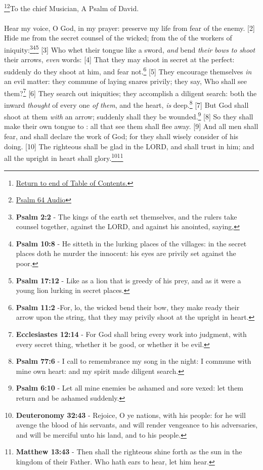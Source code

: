\footnote{\textcolor[rgb]{0.00,0.25,0.00}{\hyperlink{TOC}{Return to end of Table of Contents.}}}\footnote{\href{https://audiobible.com/bible/psalms_64.html}{\textcolor[cmyk]{0.99998,1,0,0}{Psalm 64 Audio}}}\textcolor[cmyk]{0.99998,1,0,0}{To the chief Musician, A Psalm of David.}\\
\\
\textcolor[cmyk]{0.99998,1,0,0}{Hear my voice, O God, in my prayer: preserve my life from fear of the enemy.}
[2] \textcolor[cmyk]{0.99998,1,0,0}{Hide me from the secret counsel of the wicked; from the  of the workers of iniquity:}\footnote{\textbf{Psalm 2:2} - The
kings of the earth set themselves, and the rulers take counsel together, against the LORD, and against his anointed, saying,}\footnote{\textbf{Psalm 10:8} - He sitteth in the lurking places of the villages: in the secret places doth he murder the innocent: his eyes are privily set against the poor.}\footnote{\textbf{Psalm 17:12} - Like as a lion that is greedy of his prey, and as it were a young lion lurking in secret places.}
[3] \textcolor[cmyk]{0.99998,1,0,0}{Who whet their tongue like a sword, \emph{and} bend \emph{their} \emph{bows} \emph{to} \emph{shoot} their arrows, \emph{even}  words:}
[4] \textcolor[cmyk]{0.99998,1,0,0}{That they may shoot in secret at the perfect: suddenly do they shoot at him, and fear not.}\footnote{\textbf{Psalm 11:2} -For, lo, the wicked bend their bow, they make ready their arrow upon the string, that they may privily shoot at the upright in heart.}
[5] \textcolor[cmyk]{0.99998,1,0,0}{They encourage themselves \emph{in} an evil matter: they commune of laying snares privily; they say, Who shall see them?}\footnote{\textbf{Ecclesiastes 12:14} - For God shall bring every work into judgment, with every secret thing, whether it be good, or whether it be evil.}
[6] \textcolor[cmyk]{0.99998,1,0,0}{They search out iniquities; they accomplish a diligent search: both the inward \emph{thought} of every one \emph{of} \emph{them}, and the heart, \emph{is} deep.}\footnote{\textbf{Psalm 77:6} - I call to remembrance my song in the night: I commune with mine own heart: and my spirit made diligent search.}
[7] \textcolor[cmyk]{0.99998,1,0,0}{But God shall shoot at them \emph{with} an arrow; suddenly shall they be wounded.}\footnote{\textbf{Psalm 6:10} - Let all mine enemies be ashamed and sore vexed: let them return and be ashamed suddenly.}
[8] \textcolor[cmyk]{0.99998,1,0,0}{So they shall make their own tongue to : all that see them shall flee away.}
[9] \textcolor[cmyk]{0.99998,1,0,0}{And all men shall fear, and shall declare the work of God; for they shall wisely consider of his doing.}
[10] \textcolor[cmyk]{0.99998,1,0,0}{The righteous shall be glad in the LORD, and shall trust in him; and all the upright in heart shall glory.}\footnote{\textbf{Deuteronomy 32:43} - Rejoice, O ye nations, with his people: for he will avenge the blood of his servants, and will render vengeance to his adversaries, and will be merciful unto his land, and to his people.}\footnote{\textbf{Matthew 13:43} - Then shall the righteous shine forth as the sun in the kingdom of their Father. Who hath ears to hear, let him hear.}
